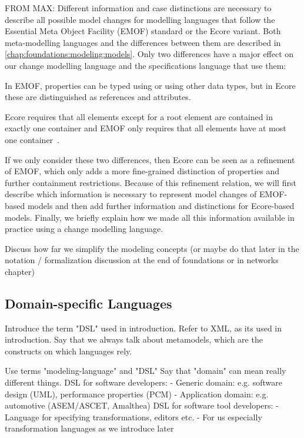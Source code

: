 FROM MAX:
Different information and case distinctions are necessary to describe all possible model changes for modelling languages that follow the Essential Meta Object Facility (EMOF) standard or the Ecore variant. 
Both meta-modelling languages and the differences between them are described in \autoref{chap:foundations:modeling:models}.
Only two differences have a major effect on our change modelling language and the specifications language that use them:
\begin{longenumerate}%
\item In EMOF, properties can be typed using \metaclasses or using other data types, but in Ecore these are distinguished as references and attributes.
\item Ecore requires that all elements except for a root element are contained in exactly one container and EMOF only requires that all elements have at most one container~\cite[pp.\ 31-32]{mof}.
\end{longenumerate}
If we only consider these two differences, then Ecore can be seen as a refinement of EMOF, which only adds a more fine-grained distinction of properties and further containment restrictions.
Because of this refinement relation, we will first describe which information is necessary to represent model changes of EMOF-based models and then add further information and distinctions for Ecore-based models.
Finally, we briefly explain how we made all this information available in practice using a change modelling language.


\label{chap:foundations:formalisms:simplification}

Discuss how far we simplify the modeling concepts (or maybe do that later in the notation / formalization discussion at the end of foundations or in networks chapter)


\subsection{Domain-specific Languages}

Introduce the term "DSL" used in introduction. Refer to XML, as its used in introduction.
Say that we always talk about metamodels, which are the constructs on which languages rely.

Use terms "modeling-language" and "DSL"
Say that "domain" can mean really different things.
DSL for software developers:
- Generic domain: e.g. software design (UML), performance properties (PCM)
- Application domain: e.g. automotive (ASEM/ASCET, Amalthea)
DSL for software tool developers:
- Language for specifying transformations, editors etc.
- For us especially transformation languages as we introduce later

